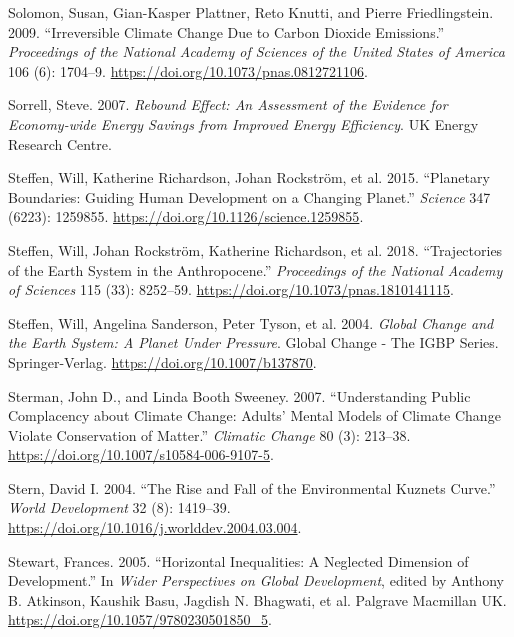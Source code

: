 \documentclass[
  a4paper,
  DIV=11,
  numbers=noendperiod,
  oneside,
  openany]{scrreprt}
\newlength{\cslhangindent}
\newenvironment{CSLReferences}[2] %
 {\begin{list}{}{%
  \setlength{\itemindent}{0pt}
  \setlength{\leftmargin}{0pt}
  \setlength{\parsep}{0pt}
  \ifodd #1
   \setlength{\leftmargin}{\cslhangindent}
   \setlength{\itemindent}{-1\cslhangindent}
  \fi
  \setlength{\itemsep}{#2\baselineskip}}}
 {\end{list}}
\begin{document}
\begin{CSLReferences}{1}{1}
Solomon, Susan, Gian-Kasper Plattner, Reto Knutti, and Pierre
Friedlingstein. 2009. {``Irreversible Climate Change Due to Carbon
Dioxide Emissions.''} \emph{Proceedings of the National Academy of
Sciences of the United States of America} 106 (6): 1704--9.
\url{https://doi.org/10.1073/pnas.0812721106}.

Sorrell, Steve. 2007. \emph{Rebound {Effect}: {An Assessment} of the
{Evidence} for {Economy-wide Energy Savings} from {Improved Energy
Efficiency}}. UK Energy Research Centre.

{Steffen, Will, Katherine Richardson, Johan Rockström, et al.} 2015.
{``Planetary Boundaries: {Guiding} Human Development on a Changing
Planet.''} \emph{Science} 347 (6223): 1259855.
\url{https://doi.org/10.1126/science.1259855}.

Steffen, Will, Johan Rockström, Katherine Richardson, et al. 2018.
{``Trajectories of the {Earth System} in the {Anthropocene}.''}
\emph{Proceedings of the National Academy of Sciences} 115 (33):
8252--59. \url{https://doi.org/10.1073/pnas.1810141115}.

Steffen, Will, Angelina Sanderson, Peter Tyson, et al. 2004.
\emph{Global {Change} and the {Earth System}: {A Planet Under
Pressure}}. Global {Change} - {The IGBP Series}. Springer-Verlag.
\url{https://doi.org/10.1007/b137870}.

Sterman, John D., and Linda Booth Sweeney. 2007. {``Understanding Public
Complacency about Climate Change: Adults' Mental Models of Climate
Change Violate Conservation of Matter.''} \emph{Climatic Change} 80 (3):
213--38. \url{https://doi.org/10.1007/s10584-006-9107-5}.

Stern, David I. 2004. {``The {Rise} and {Fall} of the {Environmental
Kuznets Curve}.''} \emph{World Development} 32 (8): 1419--39.
\url{https://doi.org/10.1016/j.worlddev.2004.03.004}.

Stewart, Frances. 2005. {``Horizontal {Inequalities}: {A Neglected
Dimension} of {Development}.''} In \emph{Wider {Perspectives} on {Global
Development}}, edited by Anthony B. Atkinson, Kaushik Basu, Jagdish N.
Bhagwati, et al. Palgrave Macmillan UK.
\url{https://doi.org/10.1057/9780230501850_5}.


\end{CSLReferences}
\end{document}
